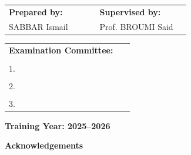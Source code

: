 \documentclass[12pt,a4paper]{report}
\begin{document}
\begin{titlepage}
  \vspace{8mm}

  \begin{center}
    \fontsize{11}{14}\selectfont
    \begin{tabular}{p{0.45\linewidth} p{0.45\linewidth}}
      \textbf{Prepared by:} & \textbf{Supervised by:} \\
      SABBAR Ismail & Prof. BROUMI Said
    \end{tabular}
  \end{center}

  \vspace{8mm}

  \begin{center}
    \fontsize{11}{14}\selectfont
    \begin{tabular}{p{0.9\linewidth}}
      \hline
      \textbf{Examination Committee:} \\
      \\[6pt] 1.\ \dotfill \\
      \\[4pt] 2.\ \dotfill \\
      \\[4pt] 3.\ \dotfill \\
      \hline
    \end{tabular}
  \end{center}

  \vfill

  \begin{center}
    {\large\bfseries\color{bleuCRMEF}
      Training Year: 2025--2026}
  \end{center}
\end{titlepage}

\newpage
{}
{}

\vspace*{1.5cm}
\begin{center}
  {\LARGE\bfseries\color{bleuCRMEF} Acknowledgements}
\end{center}
\vspace{1.0cm}
\end{document}
